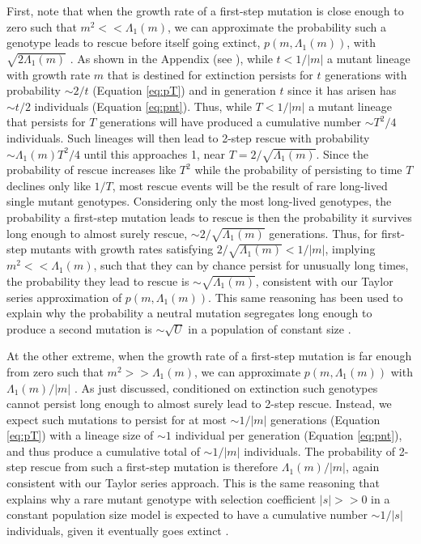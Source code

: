 \documentclass[9pt,twocolumn,twoside,lineno]{gsajnl}
\begin{document}
First, note that when the growth rate of a first-step mutation is close enough to zero such that $m^2 << \Lambda_1(m)$, we can approximate the probability such a genotype leads to rescue before itself going extinct, $p(m,\Lambda_1(m))$, with $\sqrt{2\Lambda_1(m)}$ \citep[c.f.\ equation A.4b in ][]{Iwasa2004}.
As shown in the Appendix (see ), while $t<1/|m|$ a mutant lineage with growth rate $m$ that is destined for extinction persists for $t$ generations with probability $\sim2/t$ (Equation \ref{eq:pT}) and in generation $t$ since it has arisen has $\sim t/2$ individuals (Equation \ref{eq:pnt}). 
Thus, while $T<1/|m|$ a mutant lineage that persists for $T$ generations will have produced a cumulative number $\sim T^2/4$ individuals. 
Such lineages will then lead to 2-step rescue with probability $\sim \Lambda_1(m) T^2/4$ until this approaches 1, near $T=2/\sqrt{\Lambda_1(m)}$.
Since the probability of rescue increases like $T^2$ while the probability of persisting to time $T$ declines only like $1/T$, most rescue events will be the result of rare long-lived single mutant genotypes.
Considering only the most long-lived genotypes, the probability a first-step mutation leads to rescue is then the probability it survives long enough to almost surely rescue, $\sim2/\sqrt{\Lambda_1(m)}$ generations.
Thus, for first-step mutants with growth rates satisfying $2/\sqrt{\Lambda_1(m)} < 1/|m|$, implying $m^2 << \Lambda_1(m)$, such that they can by chance persist for unusually long times, the probability they lead to rescue is $\sim\sqrt{\Lambda_1(m)}$, consistent with our Taylor series approximation of $p(m,\Lambda_1(m))$.
This same reasoning has been used to explain why the probability a neutral mutation segregates long enough to produce a second mutation is $\sim\sqrt{U}$ in a population of constant size \citep{Weissman2009}.

At the other extreme, when the growth rate of a first-step mutation is far enough from zero such that $m^2 >> \Lambda_1(m)$, we can approximate $p(m,\Lambda_1(m))$ with $\Lambda_1(m)/ |m|$ \citep[c.f.\ equation A.4c in ][]{Iwasa2004}.
As just discussed, conditioned on extinction such genotypes cannot persist long enough to almost surely lead to 2-step rescue.
Instead, we expect such mutations to persist for at most $\sim1/|m|$ generations (Equation \ref{eq:pT}) with a lineage size of $\sim1$ individual per generation (Equation \ref{eq:pnt}), and thus produce a cumulative total of $\sim 1/|m|$ individuals. 
The probability of 2-step rescue from such a first-step mutation is therefore $\Lambda_1(m)/ |m|$, again consistent with our Taylor series approach.
This is the same reasoning that explains why a rare mutant genotype with selection coefficient $|s|>>0$ in a constant population size model is expected to have a cumulative number $\sim1/|s|$ individuals, given it eventually goes extinct \citep{Weissman2009}. 
\end{document}
